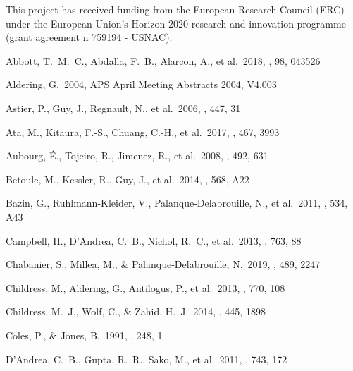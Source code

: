 \documentclass[]{aa} %
\begin{document}
\begin{acknowledgements}
This project has received funding from the European Research Council (ERC) under
the European Union's Horizon 2020 research and innovation programme (grant
agreement n 759194 - USNAC). 

\end{acknowledgements}

\begin{thebibliography}{} 
 Abbott, T.~M.~C., Abdalla, F.~B., Alarcon, A., et al.\ 2018, \prd, 98, 043526

 Aldering, G.\ 2004, APS April Meeting Abstracts 2004, V4.003

 Astier, P., Guy, J., Regnault, N., et al.\ 2006, \aap, 447, 31


 Ata, M., Kitaura, F.-S., Chuang, C.-H., et al.\ 2017, \mnras, 467, 3993

 Aubourg, {\'E}.,
  Tojeiro, R., Jimenez, R., et al.\ 2008, \aap, 492, 631 


 Betoule, M., Kessler, R., Guy, J., et al.\ 2014, \aap, 568, A22

 Bazin, G., Ruhlmann-Kleider, V., Palanque-Delabrouille, N., et al.\ 2011, \aap, 534, A43

 Campbell, H., D'Andrea, C.~B., Nichol, R.~C., et al.\ 2013, \apj, 763, 88


 Chabanier, S., Millea, M., \& Palanque-Delabrouille, N.\ 2019, \mnras, 489, 2247

 Childress, M., Aldering, G., Antilogus, P., et al.\ 2013, \apj, 770, 108

 Childress, M.~J., Wolf, C., \& Zahid, H.~J.\ 2014, \mnras, 445, 1898


 Coles, P., \& Jones, B.\ 1991, \mnras, 248, 1


 D'Andrea, C.~B., Gupta, R.~R., Sako, M., et al.\ 2011, \apj, 743, 172


\end{thebibliography}
\end{document}
